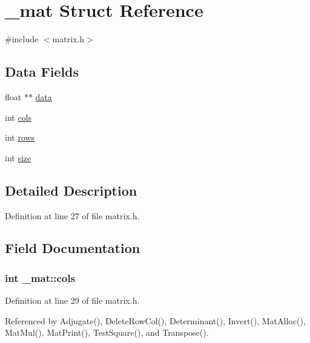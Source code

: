 \hypertarget{struct__mat}{}\section{\+\_\+mat Struct Reference}
\label{struct__mat}


{\ttfamily \#include $<$matrix.\+h$>$}

\subsection*{Data Fields}
\begin{DoxyCompactItemize}
\item 
float $\ast$$\ast$ \hyperlink{struct__mat_a00dcd82a8de11b7f16f7edfde55bcfae}{data}
\item 
int \hyperlink{struct__mat_a5ee73c0c8484d47a000464681b298762}{cols}
\item 
int \hyperlink{struct__mat_a5e6bcb8b0c0239ca9b782c48b0b3c98a}{rows}
\item 
int \hyperlink{struct__mat_ab54203ad7b60fc23832cb3b2a863857f}{size}
\end{DoxyCompactItemize}


\subsection{Detailed Description}


Definition at line 27 of file matrix.\+h.



\subsection{Field Documentation}
\subsubsection[{\texorpdfstring{cols}{cols}}]{\setlength{\rightskip}{0pt plus 5cm}int \+\_\+mat\+::cols}\hypertarget{struct__mat_a5ee73c0c8484d47a000464681b298762}{}\label{struct__mat_a5ee73c0c8484d47a000464681b298762}


Definition at line 29 of file matrix.\+h.



Referenced by Adjugate(), Delete\+Row\+Col(), Determinant(), Invert(), Mat\+Alloc(), Mat\+Mul(), Mat\+Print(), Test\+Square(), and Transpose().

